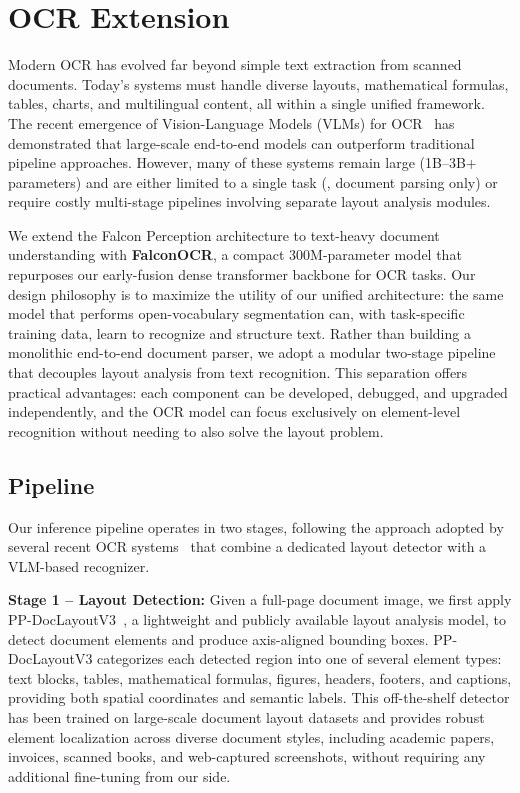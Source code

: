 



\section{OCR Extension}
\label{sec:ocr}

Modern OCR has evolved far beyond simple text extraction from scanned documents. Today's systems must handle diverse layouts, mathematical formulas, tables, charts, and multilingual content, all within a single unified framework. The recent emergence of Vision-Language Models (VLMs) for OCR~\citep{li2025monkeyocr, cui2025paddleocrvl, li2025dotsocr} has demonstrated that large-scale end-to-end models can outperform traditional pipeline approaches. However, many of these systems remain large (1B--3B+ parameters) and are either limited to a single task (\eg, document parsing only) or require costly multi-stage pipelines involving separate layout analysis modules.

We extend the Falcon Perception architecture to text-heavy document understanding with \textbf{FalconOCR}, a compact 300M-parameter model that repurposes our early-fusion dense transformer backbone for OCR tasks. Our design philosophy is to maximize the utility of our unified architecture: the same model that performs open-vocabulary segmentation can, with task-specific training data, learn to recognize and structure text. Rather than building a monolithic end-to-end document parser, we adopt a modular two-stage pipeline that decouples layout analysis from text recognition. This separation offers practical advantages: each component can be developed, debugged, and upgraded independently, and the OCR model can focus exclusively on element-level recognition without needing to also solve the layout problem.

\subsection{Pipeline}

Our inference pipeline operates in two stages, following the approach adopted by several recent OCR systems~\citep{li2025monkeyocr, niu2025mineru25decoupledvisionlanguagemodel, cui2025paddleocrvl} that combine a dedicated layout detector with a VLM-based recognizer.

\noindent \textbf{Stage 1 -- Layout Detection:} Given a full-page document image, we first apply PP-DocLayoutV3~\citep{cui2025paddleocr30technicalreport}, a lightweight and publicly available layout analysis model, to detect document elements and produce axis-aligned bounding boxes. PP-DocLayoutV3 categorizes each detected region into one of several element types: text blocks, tables, mathematical formulas, figures, headers, footers, and captions, providing both spatial coordinates and semantic labels. This off-the-shelf detector has been trained on large-scale document layout datasets and provides robust element localization across diverse document styles, including academic papers, invoices, scanned books, and web-captured screenshots, without requiring any additional fine-tuning from our side.

